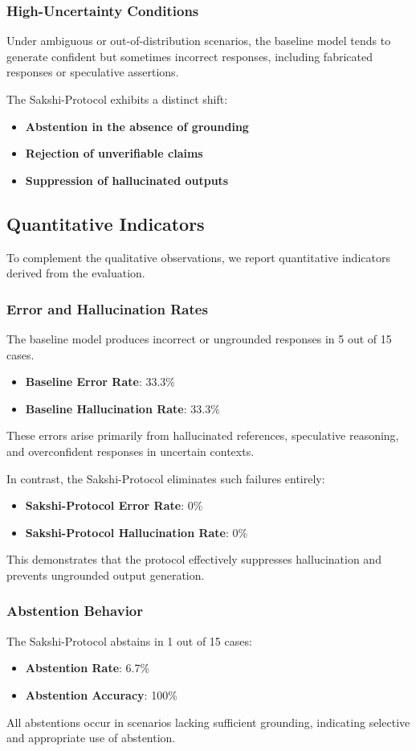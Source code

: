 \documentclass[12pt,a4paper]{article}
\begin{document}
\subsubsection*{High-Uncertainty Conditions}
Under ambiguous or out-of-distribution scenarios, the baseline model tends to generate confident but sometimes incorrect responses, including fabricated responses or speculative assertions.

The Sakshi-Protocol exhibits a distinct shift:
\begin{itemize}
    \item \textbf{Abstention in the absence of grounding}
    \item \textbf{Rejection of unverifiable claims}
    \item \textbf{Suppression of hallucinated outputs}
\end{itemize}

\subsection{Quantitative Indicators}
To complement the qualitative observations, we report quantitative indicators derived from the evaluation.
\subsubsection*{Error and Hallucination Rates}
The baseline model produces incorrect or ungrounded responses in 5 out of 15 cases.
\begin{itemize}
    \item \textbf{Baseline Error Rate}: 33.3\%
    \item \textbf{Baseline Hallucination Rate}: 33.3\%
\end{itemize}
These errors arise primarily from hallucinated references, speculative reasoning, and overconfident responses in uncertain contexts.

In contrast, the Sakshi-Protocol eliminates such failures entirely:
\begin{itemize}
    \item \textbf{Sakshi-Protocol Error Rate}: 0\%
    \item \textbf{Sakshi-Protocol Hallucination Rate}: 0\%
\end{itemize}
This demonstrates that the protocol effectively suppresses hallucination and prevents ungrounded output generation.

\subsubsection*{Abstention Behavior}
The Sakshi-Protocol abstains in 1 out of 15 cases:
\begin{itemize}
    \item \textbf{Abstention Rate}: 6.7\%
    \item \textbf{Abstention Accuracy}: 100\%
\end{itemize}
All abstentions occur in scenarios lacking sufficient grounding, indicating selective and appropriate use of abstention.
\end{document}
